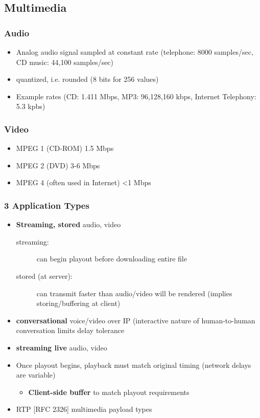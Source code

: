 \subsection{Multimedia}
\subsubsection{Audio}
\begin{itemize}
	\item Analog audio signal sampled at constant rate (telephone: 8000 samples/sec, CD music: 44,100 samples/sec)
	\item quantized, i.e. rounded (8 bits for 256 values)
	\item Example rates (CD: 1.411 Mbps, MP3: 96,128,160 kbps, Internet Telephony: 5.3 kpbs)
\end{itemize}
\subsubsection{Video}
\begin{itemize}
	\item MPEG 1 (CD-ROM) 1.5 Mbps
	\item MPEG 2 (DVD) 3-6 Mbps
	\item MPEG 4 (often used in Internet) <1 Mbps
\end{itemize}
\subsubsection{3 Application Types}
\begin{itemize}
	\item\textbf{Streaming, stored} audio, video
	\begin{description}
		\item[streaming:] can begin playout before downloading entire file
		\item[stored (at server):] can transmit faster than audio/video will be rendered (implies storing/buffering at client)
	\end{description}
	\item\textbf{conversational} voice/video over IP (interactive nature of human-to-human conversation limits delay tolerance
	\item\textbf{streaming live} audio, video
	\item Once playout begins, playback must match original timing (network delays are variable)
	\begin{itemize}
		\item\textbf{Client-side buffer} to match playout requirements
	\end{itemize}
	\item RTP [RFC 2326] multimedia payload types
\end{itemize}

